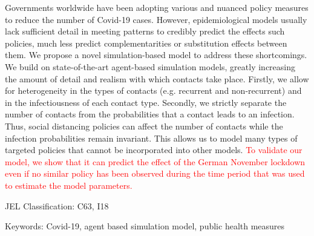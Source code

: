 \noindent
Governments worldwide have been adopting various and nuanced policy measures
to reduce the number of Covid-19 cases.
However, epidemiological models usually lack sufficient detail in meeting
patterns to credibly predict the effects such policies, much less predict
complementarities or substitution effects between them.
We propose a novel simulation-based model to address these shortcomings.
We build on state-of-the-art agent-based simulation models, greatly increasing
the amount of detail and realism with which contacts take place.
Firstly, we allow for heterogeneity in the types of contacts (e.g. recurrent and
non-recurrent) and in the infectiousness of each contact type.
Secondly, we strictly separate the number of contacts from the probabilities
that a contact leads to an infection.
Thus, social distancing policies can affect the number of contacts while the
infection probabilities remain invariant.
This allows us to model many types of targeted policies that cannot be
incorporated into other models.
\textcolor{red}{
To validate our model, we show that it can predict the effect of the German
November lockdown even if no similar policy has been observed during the time
period that was used to estimate the model parameters.
}

\vspace{1cm}
\noindent JEL Classification: C63, I18

\noindent Keywords: Covid-19, agent based simulation model, public health measures

